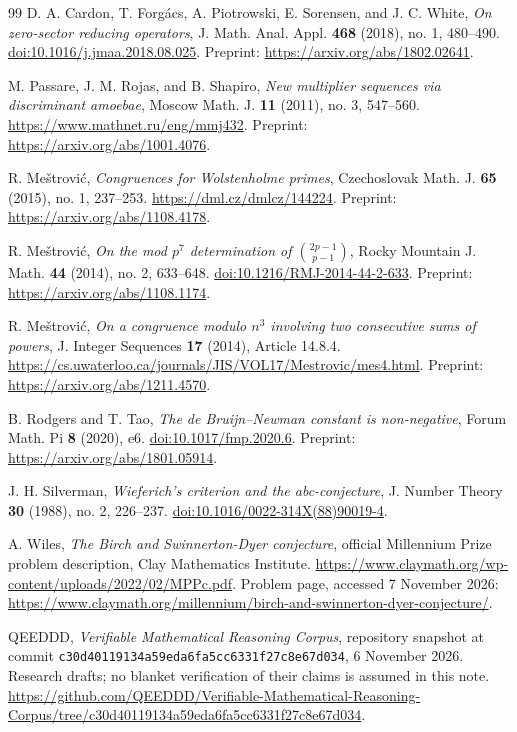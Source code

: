 \documentclass[11pt,a4paper]{article}
\theoremstyle{definition}
\theoremstyle{remark}
\begin{document}
\begingroup
\raggedright
\begin{thebibliography}{99}
D. A. Cardon, T. Forg\'acs, A. Piotrowski, E. Sorensen, and J. C. White,
\emph{On zero-sector reducing operators},
J. Math. Anal. Appl. \textbf{468} (2018), no. 1, 480--490.
\href{https://doi.org/10.1016/j.jmaa.2018.08.025}{doi:10.1016/j.jmaa.2018.08.025}.
Preprint: \url{https://arxiv.org/abs/1802.02641}.

M. Passare, J. M. Rojas, and B. Shapiro,
\emph{New multiplier sequences via discriminant amoebae},
Moscow Math. J. \textbf{11} (2011), no. 3, 547--560.
\url{https://www.mathnet.ru/eng/mmj432}.
Preprint: \url{https://arxiv.org/abs/1001.4076}.

R. Me\v{s}trovi\'c, \emph{Congruences for Wolstenholme primes},
Czechoslovak Math. J. \textbf{65} (2015), no. 1, 237--253.
\url{https://dml.cz/dmlcz/144224}.
Preprint: \url{https://arxiv.org/abs/1108.4178}.

R. Me\v{s}trovi\'c,
\emph{On the mod $p^7$ determination of $\binom{2p-1}{p-1}$},
Rocky Mountain J. Math. \textbf{44} (2014), no. 2, 633--648.
\href{https://doi.org/10.1216/RMJ-2014-44-2-633}{doi:10.1216/RMJ-2014-44-2-633}.
Preprint: \url{https://arxiv.org/abs/1108.1174}.

R. Me\v{s}trovi\'c,
\emph{On a congruence modulo $n^3$ involving two consecutive sums of powers},
J. Integer Sequences \textbf{17} (2014), Article 14.8.4.
\url{https://cs.uwaterloo.ca/journals/JIS/VOL17/Mestrovic/mes4.html}.
Preprint: \url{https://arxiv.org/abs/1211.4570}.

B. Rodgers and T. Tao,
\emph{The de Bruijn--Newman constant is non-negative},
Forum Math. Pi \textbf{8} (2020), e6.
\href{https://doi.org/10.1017/fmp.2020.6}{doi:10.1017/fmp.2020.6}.
Preprint: \url{https://arxiv.org/abs/1801.05914}.

J. H. Silverman,
\emph{Wieferich's criterion and the abc-conjecture},
J. Number Theory \textbf{30} (1988), no. 2, 226--237.
\href{https://doi.org/10.1016/0022-314X(88)90019-4}{doi:10.1016/0022-314X(88)90019-4}.

A. Wiles, \emph{The Birch and Swinnerton-Dyer conjecture},
official Millennium Prize problem description, Clay Mathematics Institute.
\url{https://www.claymath.org/wp-content/uploads/2022/02/MPPc.pdf}.
Problem page, accessed 7 November 2026:
\url{https://www.claymath.org/millennium/birch-and-swinnerton-dyer-conjecture/}.

QEEDDD, \emph{Verifiable Mathematical Reasoning Corpus},
repository snapshot at commit
\texttt{c30d40119134a59eda6fa5cc6331f27c8e67d034},
6 November 2026.  Research drafts; no blanket verification of their
claims is assumed in this note.
\url{https://github.com/QEEDDD/Verifiable-Mathematical-Reasoning-Corpus/tree/c30d40119134a59eda6fa5cc6331f27c8e67d034}.
\end{thebibliography}
\endgroup
\end{document}
